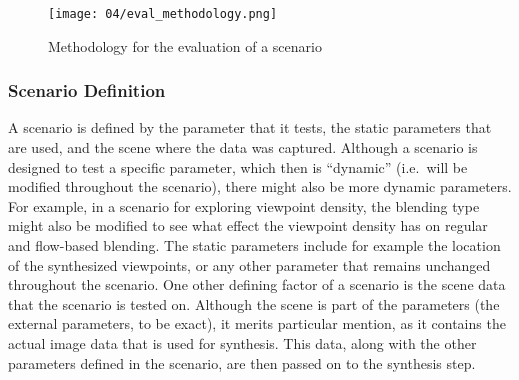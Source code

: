 \begin{figure}
		\centering
		\texttt{[image: 04/eval\_methodology.png]}
		\caption{Methodology for the evaluation of a scenario}
		\label{fig:eval-methodology}
\end{figure}

\subsubsection{Scenario Definition}
A scenario is defined by the parameter that it tests, the static parameters that are used, and the scene where the data was captured. Although a scenario is designed to test a specific parameter, which then is ``dynamic'' (i.e.\ will be modified throughout the scenario), there might also be more dynamic parameters. For example, in a scenario for exploring viewpoint density, the blending type might also be modified to see what effect the viewpoint density has on regular and flow-based blending. The static parameters include for example the location of the synthesized viewpoints, or any other parameter that remains unchanged throughout the scenario. One other defining factor of a scenario is the scene data that the scenario is tested on. Although the scene is part of the parameters (the external parameters, to be exact), it merits particular mention, as it contains the actual image data that is used for synthesis. This data, along with the other parameters defined in the scenario, are then passed on to the synthesis step.



